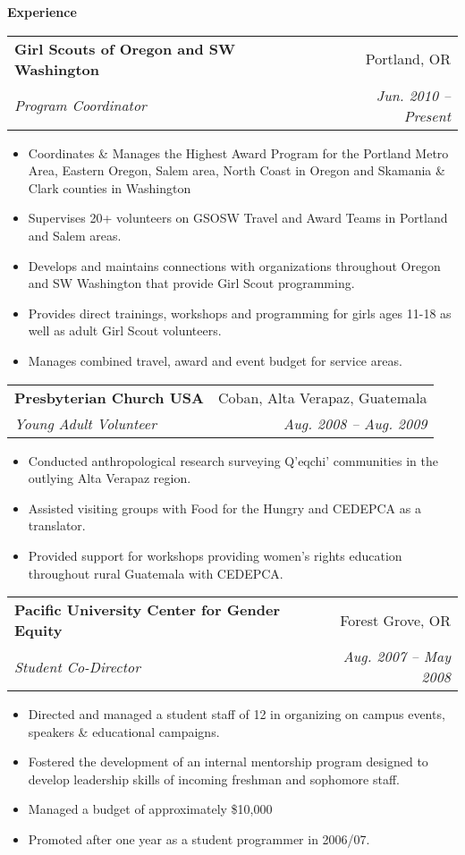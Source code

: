 \documentclass[letterpaper,11pt]{article}
\makeatletter
\newcommand{\resitem}[1]{\item #1 \vspace{-2pt}}
\newcommand{\resheading}[1]{{\large \colorbox{mygrey}{\begin{minipage}{\textwidth}{\textbf{#1 \vphantom{p\^{E}}}}\end{minipage}}}}
\newcommand{\ressubheading}[4]{
\begin{tabular*}{6.75in}{l@{\extracolsep{\fill}}r}
		\textbf{#1} & #2 \\
		\textit{#3} & \textit{#4} \\
\end{tabular*}\vspace{-6pt}}
\makeatother
\begin{document}
\resheading{Experience}
	\begin{description}
		\item 
			\ressubheading{Girl Scouts of Oregon and SW Washington}{Portland, OR}{\textcolor{mygreylink}{Program Coordinator}}{Jun. 2010 -- Present}
				{ \footnotesize
				\begin{itemize}
                \resitem{Coordinates \& Manages the Highest Award Program for the Portland Metro Area, Eastern Oregon, Salem area, North Coast in Oregon and Skamania \& Clark counties in Washington}
                \resitem{Supervises 20+ volunteers on GSOSW Travel and Award Teams in Portland and Salem areas.}
                \resitem{Develops and maintains connections with organizations throughout Oregon and SW Washington that provide Girl Scout programming.}
                \resitem{Provides direct trainings, workshops and programming for girls ages 11-18 as well as adult Girl Scout volunteers.}
                \resitem{Manages combined travel, award and event budget for service areas.}
				\end{itemize}
				}
		\item


			\ressubheading{Presbyterian Church USA}{Coban, Alta Verapaz, Guatemala}{\textcolor{mygreylink}{Young Adult Volunteer}}{Aug. 2008 -- Aug. 2009}
				{ \footnotesize
				\begin{itemize}
                    \resitem{Conducted anthropological research surveying Q’eqchi’ communities in the outlying Alta Verapaz region.}
                    \resitem{Assisted visiting groups with Food for the Hungry and CEDEPCA as a translator.}
                    \resitem{Provided support for workshops providing women’s rights education throughout rural Guatemala with CEDEPCA.}
				\end{itemize}
          			}
		\item			
			\ressubheading{Pacific University Center for Gender Equity}{Forest Grove, OR}{\textcolor{mygreylink}{Student Co-Director}}{Aug. 2007 -- May 2008}
				{ \footnotesize				
				\begin{itemize}
                    \resitem{Directed and managed a student staff of 12 in organizing on campus events, speakers \& educational campaigns.}
                    \resitem{Fostered the development of an internal mentorship program designed to develop leadership skills of incoming freshman and sophomore staff.}
                    \resitem{Managed a budget of approximately \$10,000}
                    \resitem{Promoted after one year as a student  programmer in 2006/07.}
				\end{itemize}
				}

	\end{description} %
\end{document}
